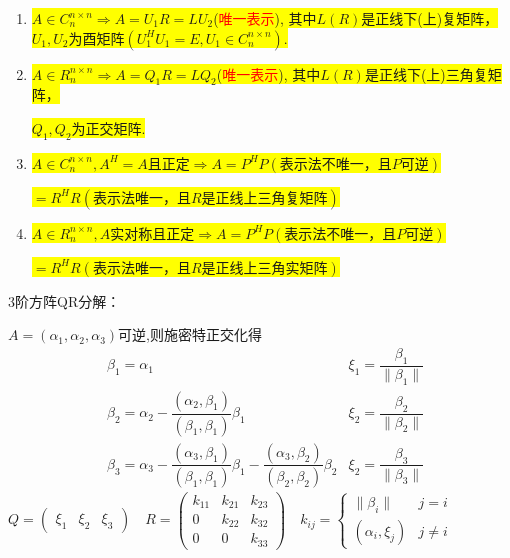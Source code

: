 \begin{theorem}
\begin{enumerate}
\item\colorbox{yellow}{$A\in C^{n\times n}_n \Rightarrow A=U_1R=LU_2$(\textcolor{red}{唯一表示}),   其中$L(R)$是正线下(上)复矩阵，}
\colorbox{yellow}{$U_1,U_2$为酉矩阵$(U_1^HU_1=E,U_1\in C^{n\times n}_n)$.}
\item \colorbox{yellow}{$A\in R^{n\times n}_n \Rightarrow A=Q_1R=LQ_2$(\textcolor{red}{唯一表示}), 其中$L(R)$是正线下(上)三角复矩阵，  }

\colorbox{yellow}{$Q_1,Q_2$为正交矩阵.}

\item \colorbox{yellow}{$A\in C^{n\times n}_n,A^H=A$且正定$\Rightarrow A=P^HP(\mbox{表示法不唯一，且}P\mbox{可逆})$}

\hspace{5.85cm}\colorbox{yellow}{$= R^HR(\mbox{表示法唯一，且}R\mbox{是正线上三角复矩阵})$}

\item \colorbox{yellow}{$A\in R^{n\times n}_n,A$实对称且正定$\Rightarrow A=P^HP(\mbox{表示法不唯一，且}P\mbox{可逆})$}

\hspace{5.9cm}\colorbox{yellow}{$= R^HR(\mbox{表示法唯一，且}R\mbox{是正线上三角实矩阵})$}
\end{enumerate}
\end{theorem}
\begin{note}
3阶方阵QR分解：
	
	$A=(\alpha_1,\alpha_{2},\alpha_3)$可逆,则施密特正交化得
	\begin{align*}
		&\beta_1=\alpha_1  & \xi_1=\dfrac{\beta_1}{\|\beta_1\|}\\
		&\beta_2=\alpha_{2}-\dfrac{(\alpha_2,\beta_1)}{(\beta_1,
			\beta_1)}\beta_1& \xi_2=\dfrac{\beta_2}{\|\beta_2\|}\\
		&\beta_3=\alpha_{3}-\dfrac{(\alpha_3,\beta_1)}{(\beta_1,
			\beta_1)}\beta_1-\dfrac{(\alpha_3,\beta_2)}{(\beta_2,
			\beta_2)}\beta_2& \xi_2=\dfrac{\beta_3}{\|\beta_3\|}
	\end{align*}
$Q=\begin{pmatrix}
	\xi_1&\xi_2&\xi_3
\end{pmatrix}\quad
R=\begin{pmatrix}
	k_{11}& k_{21}&k_{23}\\
	0&k_{22}&k_{32}\\
	0&0&k_{33}
\end{pmatrix}\quad k_{ij}=\left\{\begin{array}{ll}
\|\beta_i\|&j=i\\
(\alpha_i,\xi_j)&j\ne i
\end{array}\right.
$



\end{note}


